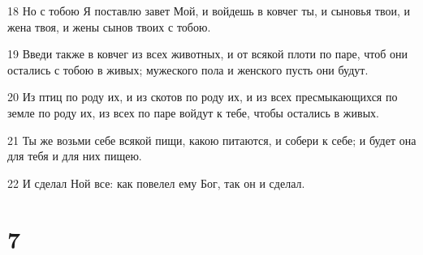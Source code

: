 \par 18 Но с тобою Я поставлю завет Мой, и войдешь в ковчег ты, и сыновья твои, и жена твоя, и жены сынов твоих с тобою.
\par 19 Введи также в ковчег из всех животных, и от всякой плоти по паре, чтоб они остались с тобою в живых; мужеского пола и женского пусть они будут.
\par 20 Из птиц по роду их, и из скотов по роду их, и из всех пресмыкающихся по земле по роду их, из всех по паре войдут к тебе, чтобы остались в живых.
\par 21 Ты же возьми себе всякой пищи, какою питаются, и собери к себе; и будет она для тебя и для них пищею.
\par 22 И сделал Ной все: как повелел ему Бог, так он и сделал.

\chapter{7}


